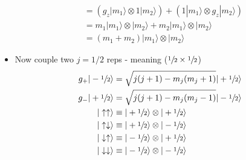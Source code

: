 \documentclass[../main.tex]{subfiles}
\begin{document}
\begin{itemize}
\begin{align}
&=(g_{z}|m_1\rangle\otimes1|m_2\rangle)+(1|m_1\rangle\otimes g_{z}|m_2\rangle)\\
&=m_1|m_1\rangle\otimes|m_2\rangle+m_2|m_1\rangle\otimes |m_2\rangle\\
&=(m_1+m_2)|m_1\rangle\otimes|m_2\rangle
\end{align}
\item Now couple two $j=1/2$ reps - meaning ($\sfrac{1}{2}\times\sfrac{1}{2}$)
\begin{align}
g_+|-\sfrac{1}{2}\rangle&=\sqrt{j(j+1)-m_j(m_j+1)}|+\sfrac{1}{2}\rangle\\
g_-|+\sfrac{1}{2}\rangle&=\sqrt{j(j+1)-m_j(m_j-1)}|-\sfrac{1}{2}\rangle\\
|\uparrow\uparrow\rangle&\equiv|+\sfrac{1}{2}\rangle\otimes|+\sfrac{1}{2}\rangle\\
|\uparrow\downarrow\rangle&\equiv|+\sfrac{1}{2}\rangle\otimes|-\sfrac{1}{2}\rangle\\
|\downarrow\uparrow\rangle&\equiv|-\sfrac{1}{2}\rangle\otimes|+\sfrac{1}{2}\rangle\\
|\downarrow\downarrow\rangle&\equiv|-\sfrac{1}{2}\rangle\otimes|-\sfrac{1}{2}\rangle
\end{align}


\end{itemize}
\end{document}

